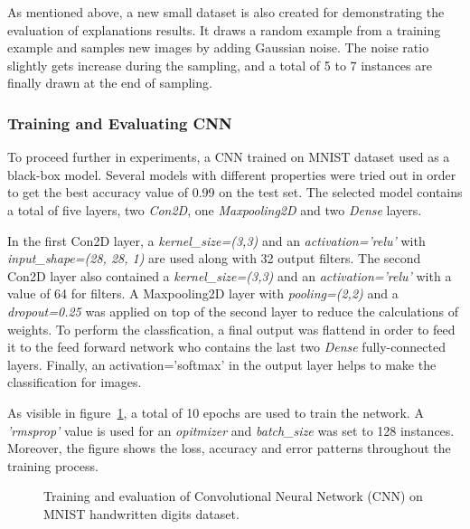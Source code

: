 \documentclass[english]{tktltiki2}
\theoremstyle{definition}
\theoremstyle{remark}
\begin{document}
As mentioned above, a new small dataset is also created for demonstrating the evaluation of explanations results. It draws a random example from a training example and samples new images by adding Gaussian noise. The noise ratio slightly gets increase during the sampling, and a total of 5 to 7 instances are finally drawn at the end of sampling.

\subsubsection{Training and Evaluating CNN}
To proceed further in experiments, a CNN trained on MNIST dataset used as a black-box model. Several models with different properties were tried out in order to get the best accuracy value of 0.99 on the test set. The selected model contains a total of five layers, two \textit{Con2D}, one \textit{Maxpooling2D} and two \textit{Dense} layers.

In the first Con2D layer, a\textit{ kernel\_size=(3,3)} and an \textit{activation='relu'} with \textit{input\_shape=(28, 28, 1)} are used along with 32 output filters. The second Con2D layer also contained a \textit{kernel\_size=(3,3)} and an \textit{activation='relu'} with a value of 64 for filters. A Maxpooling2D layer with \textit{pooling=(2,2)} and a \textit{dropout=0.25} was applied on top of the second layer to reduce the calculations of weights. To perform the classfication, a final output was flattend in order to feed it to the feed forward network who contains the last two \textit{Dense} fully-connected layers. Finally, an activation='softmax' in the output layer helps to make the classification for images.

As visible in figure~\ref{fig:cnn_training_plots}, a total of 10 epochs are used to train the network. A \textit{'rmsprop'} value is used for an \textit{opitmizer} and \textit{batch\_size} was set to 128 instances. Moreover, the figure shows the loss, accuracy and error patterns throughout the training process.

\begin{figure}[H]
	\centering
	\hspace*{\fill}%
	\qquad
	\caption{Training and evaluation of Convolutional Neural Network (CNN) on MNIST handwritten digits dataset.}%
	\label{fig:cnn_training_plots}%
\end{figure}
\end{document}
